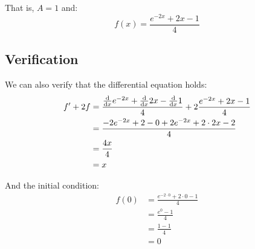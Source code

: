     That is, $A = 1$ and:
    \[
        f(x) = \frac{e^{-2x} + 2x - 1}{4}
    \]

    \subsection*{Verification}

        We can also verify that the differential equation holds:
        \begin{align*}
            f' + 2f &= \frac{\dv{x} e^{-2x} + \dv{x} 2x - \dv{x} 1}{4} + 2 \frac{e^{-2x} + 2x - 1}{4} \\
            &= \frac{-2 e^{-2x} + 2 - 0 + 2 e^{-2x} + 2 \cdot 2x - 2}{4} \\
            &= \frac{4x}{4} \\
            &= x
        \end{align*}

        And the initial condition:
        \begin{align*}
            f(0) &= \frac{e^{-2 \cdot 0} + 2 \cdot 0 - 1}{4} \\
            &= \frac{e^0 - 1}{4} \\
            &= \frac{1 - 1}{4} \\
            &= 0
        \end{align*}
